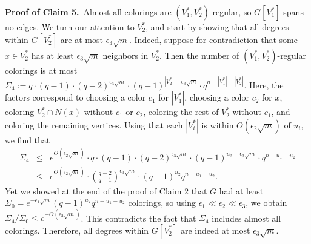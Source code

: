 \documentclass[11pt]{article}
\begin{document}
\noindent \textbf{Proof of Claim 5.}\, Almost all colorings are
$(V_1^*, V_2^*)$-regular, so $G[V_1^*]$ spans no edges.  We turn our
attention to $V_2^*$, and start by showing that all degrees within
$G[V_2^*]$ are at most $\epsilon_3 \sqrt{m}$.  Indeed, suppose for
contradiction that some $x \in V_2^*$ has at least $\epsilon_3
\sqrt{m}$ neighbors in $V_2^*$.  Then the number of $(V_1^*,
V_2^*)$-regular colorings is at most $\Sigma_4 := q \cdot (q-1) \cdot
(q-2)^{\epsilon_3 \sqrt{m}} \cdot (q-1)^{|V_2^*| - \epsilon_3
  \sqrt{m}} \cdot q^{n-|V_1^*|-|V_2^*|}$.  Here, the factors
correspond to choosing a color $c_1$ for $|V_1^*|$, choosing a color
$c_2$ for $x$, coloring $V_2^* \cap N(x)$ without $c_1$ or $c_2$,
coloring the rest of $V_2^*$ without $c_1$, and coloring the remaining
vertices.  Using that each $|V_i^*|$ is within $O(\epsilon_2
\sqrt{m})$ of $u_i$, we find that
\begin{eqnarray*}
  \Sigma_4 &\leq& e^{O(\epsilon_2 \sqrt{m})} \cdot q \cdot (q-1) \cdot
  (q-2)^{\epsilon_3 \sqrt{m}} \cdot (q-1)^{u_2 - \epsilon_3
    \sqrt{m}} \cdot q^{n - u_1 - u_2} \\
  &\leq& e^{O(\epsilon_2 \sqrt{m})} \cdot \left(
  \frac{q-2}{q-1} \right)^{\epsilon_3 \sqrt{m}} \cdot (q-1)^{u_2}
  q^{n-u_1-u_2}.
\end{eqnarray*}
Yet we showed at the end of the proof of Claim 2 that $G$ had at least
$\Sigma_0 = e^{-\epsilon_1 \sqrt{m}} (q-1)^{u_2} q^{n-u_1-u_2}$
colorings, so using $\epsilon_1 \ll \epsilon_2 \ll \epsilon_3$, we
obtain $\Sigma_4 / \Sigma_0 \leq e^{-\Theta(\epsilon_3 \sqrt{m})}$.
This contradicts the fact that $\Sigma_4$ includes almost all
colorings.  Therefore, all degrees within $G[V_2^*]$ are indeed at
most $\epsilon_3 \sqrt{m}$.

\end{document}
